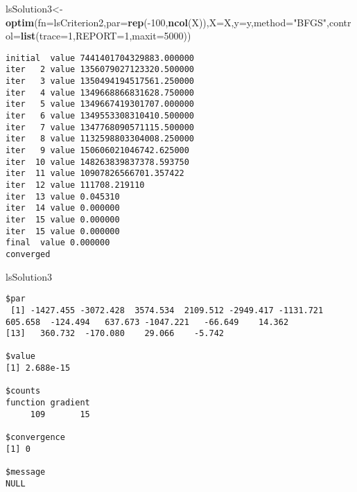 \documentclass[10pt,]{article}
\newenvironment{Shaded}{\begin{snugshade}}{\end{snugshade}}
\newcommand{\KeywordTok}[1]{\textcolor[rgb]{0.13,0.29,0.53}{\textbf{{#1}}}}
\newcommand{\DataTypeTok}[1]{\textcolor[rgb]{0.13,0.29,0.53}{{#1}}}
\newcommand{\DecValTok}[1]{\textcolor[rgb]{0.00,0.00,0.81}{{#1}}}
\newcommand{\StringTok}[1]{\textcolor[rgb]{0.31,0.60,0.02}{{#1}}}
\newcommand{\NormalTok}[1]{{#1}}
\begin{document}
\begin{Shaded}
\begin{Highlighting}[]
\NormalTok{lsSolution3<-}\KeywordTok{optim}\NormalTok{(}\DataTypeTok{fn=}\NormalTok{lsCriterion2,}\DataTypeTok{par=}\KeywordTok{rep}\NormalTok{(-}\DecValTok{100}\NormalTok{,}\KeywordTok{ncol}\NormalTok{(X)),}\DataTypeTok{X=}\NormalTok{X,}\DataTypeTok{y=}\NormalTok{y,}\DataTypeTok{method=}\StringTok{"BFGS"}\NormalTok{,}\DataTypeTok{control=}\KeywordTok{list}\NormalTok{(}\DataTypeTok{trace=}\DecValTok{1}\NormalTok{,}\DataTypeTok{REPORT=}\DecValTok{1}\NormalTok{,}\DataTypeTok{maxit=}\DecValTok{5000}\NormalTok{))}
\end{Highlighting}
\end{Shaded}

\begin{verbatim}
initial  value 7441401704329883.000000 
iter   2 value 1356079027123320.500000
iter   3 value 1350494194517561.250000
iter   4 value 1349668866831628.750000
iter   5 value 1349667419301707.000000
iter   6 value 1349553308310410.500000
iter   7 value 1347768090571115.500000
iter   8 value 1132598803304008.250000
iter   9 value 150606021046742.625000
iter  10 value 148263839837378.593750
iter  11 value 10907826566701.357422
iter  12 value 111708.219110
iter  13 value 0.045310
iter  14 value 0.000000
iter  15 value 0.000000
iter  15 value 0.000000
final  value 0.000000 
converged
\end{verbatim}

\begin{Shaded}
\begin{Highlighting}[]
\NormalTok{lsSolution3}
\end{Highlighting}
\end{Shaded}

\begin{verbatim}
$par
 [1] -1427.455 -3072.428  3574.534  2109.512 -2949.417 -1131.721   605.658  -124.494   637.673 -1047.221   -66.649    14.362
[13]   360.732  -170.080    29.066    -5.742

$value
[1] 2.688e-15

$counts
function gradient 
     109       15 

$convergence
[1] 0

$message
NULL
\end{verbatim}

\begin{Shaded}
\end{Shaded}
\end{document}
